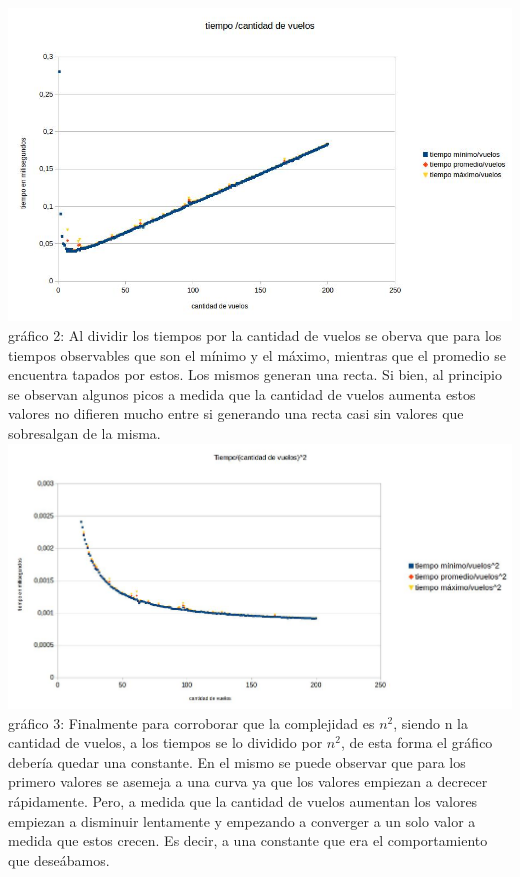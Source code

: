 \documentclass[a4paper]{article}
\begin{document}
\includegraphics[width=\textwidth,height=\textheight,keepaspectratio
]{divididon.jpg}\newline
gráfico 2: Al dividir los tiempos por la cantidad de vuelos se oberva que para los tiempos observables que son el mínimo y el máximo, mientras que el promedio se encuentra tapados por estos. Los mismos generan una recta. Si bien, al principio se observan algunos picos a medida que la cantidad de vuelos aumenta estos valores no difieren mucho entre si generando una recta casi sin valores que sobresalgan de la misma.\newline
\includegraphics[width=\textwidth,height=\textheight,keepaspectratio
]{porcuadrado.jpg}\newline
gráfico 3: Finalmente para corroborar que la complejidad es $n^{2}$, siendo n la cantidad de vuelos, a los tiempos se lo dividido por $n^{2}$, de esta forma el gráfico debería quedar una constante. En el mismo se puede observar que para los primero valores se asemeja a una curva ya que los valores empiezan a decrecer rápidamente. Pero, a medida que la cantidad de vuelos aumentan los valores empiezan a disminuir lentamente y empezando a converger a un solo valor a medida que estos crecen. Es decir, a una constante que era el comportamiento que deseábamos.
\end{document}
